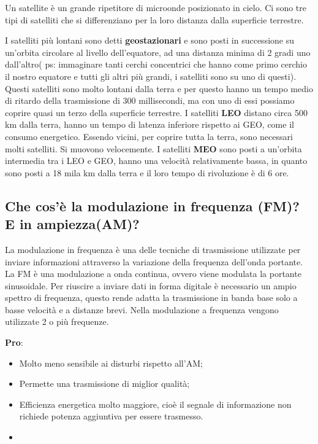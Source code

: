 Un satellite è un grande ripetitore di microonde posizionato in cielo. Ci sono tre tipi di satelliti che si
differenziano per la loro distanza dalla superficie terrestre.

I satelliti più lontani sono detti \textbf{geostazionari} e sono posti in successione su un’orbita circolare al livello dell’equatore, ad una distanza minima di 2 gradi uno dall'altro( ps: immaginare tanti cerchi
concentrici che hanno come primo cerchio il nostro equatore e tutti gli altri più grandi, i satelliti
sono su uno di questi). Questi satelliti sono molto lontani dalla terra e per questo hanno un tempo
medio di ritardo della trasmissione di 300 millisecondi, ma con uno di essi possiamo coprire quasi
un terzo della superficie terrestre. I satelliti \textbf{LEO} distano circa 500 km dalla terra, hanno un tempo di latenza inferiore rispetto ai GEO, come il consumo energetico. Essendo vicini, per coprire tutta la
terra, sono necessari molti satelliti. Si muovono velocemente. I satelliti \textbf{MEO} sono posti a un'orbita intermedia tra i LEO e GEO, hanno una velocità relativamente bassa, in quanto sono posti a 18 mila
km dalla terra e il loro tempo di rivoluzione è di 6 ore.

\subsection{Che cos'è la modulazione in frequenza (FM)? E in ampiezza(AM)?}

La modulazione in frequenza è una delle tecniche di trasmissione utilizzate per inviare informazioni
attraverso la variazione della frequenza dell’onda portante. La FM è una modulazione a onda
continua, ovvero viene modulata la portante sinusoidale.
Per riuscire a inviare dati in forma digitale è necessario un ampio spettro di frequenza, questo
rende adatta la trasmissione in banda base solo a basse velocità e a distanze brevi. Nella
modulazione a frequenza vengono utilizzate 2 o più frequenze.

\textbf{Pro}:

\begin{itemize}

\item Molto meno sensibile ai disturbi rispetto all’AM;
\item Permette una trasmissione di miglior qualità;
\item Efficienza energetica molto maggiore, cioè il segnale di informazione non richiede potenza aggiuntiva per essere trasmesso.
\item 

\end{itemize}


